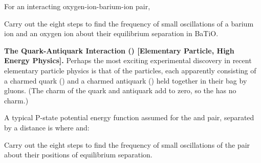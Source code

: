 {\begin{one-digit-list}
For an interacting oxygen-ion-barium-ion pair,
%
%
%
%
%

Carry out the eight steps to find the frequency of small oscillations of a
barium ion and an oxygen ion about their equilibrium separation in BaTiO.

\item [9.] {\bf The Quark-Antiquark  Interaction ()
[Elementary Particle, High Energy Physics].}
Perhaps the most exciting experimental discovery in recent elementary
particle physics is that of the \m{\psi} particles, each apparently
consisting of a charmed quark () and a charmed antiquark () held
together in their bag by gluons.
(The charm of the quark and antiquark add to zero, so the \m{\psi} has
no charm.)

A typical P-state potential energy function assumed for the  and
 pair, separated by a distance  is
%
%
%
where
%
%
%
%
and:
%

Carry out the eight steps to find the frequency of small oscillations of the
 pair about their positions of equilibrium separation.
\end{one-digit-list}

\BriefAns

}
